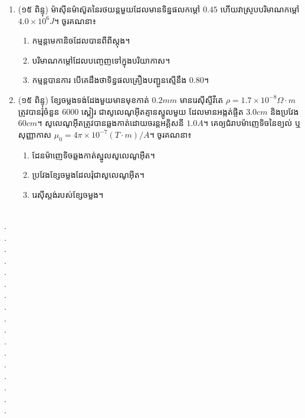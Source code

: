 \documentclass{officialexam}
\begin{document}
\begin{enumerate}[m]
\begin{multicols}{2}
	\end{multicols}
	\item (១៥ ពិន្ទុ) ម៉ាសុីនម៉ាស៊ូតនៃរថយន្តមួយដែលមានទិន្នផលកម្តៅ $0.45$ ហើយវាស្រូបបរិមាណកម្តៅ $4.0\times 10^{6}J$។ ចូរគណនា៖
	\begin{enumerate}[k]
		\item កម្មន្តមេកានិចដែលបានពីពីស្តុង។
		\item បរិមាណកម្តៅដែលបញ្ចេញទៅក្នុងបរិយាកាស។
		\item កម្មន្តបានការ បើគេដឹងថាទិន្នផលគ្រឿងបញ្ជួនស្មើនឹង $0.80$។
	\end{enumerate}
	\item (១៥ ពិន្ទុ) ខ្សែចម្លងទង់ដែងមួយមានមុខកាត់ $0.2mm$ មានរេសុីស្ទីវីតេ $\rho=1.7\times10^{-8}\Omega\cdot m$ ត្រូវបានរុំចំនួន $6000$ ស្ពៀរ ជាសូលេណូអុីតគ្មានស្នូលមួយ ដែលមានអង្កត់ផ្ចិត $3.0cm$ និងប្រវែង $60cm$។ សូលេណូអុីតត្រូវបានឆ្លងកាត់ដោយចរន្តអគ្គិសនី $1.0A$។ គេឲ្យជំរាបម៉ាញេទិចនៃខ្យល់ ឬសុញ្ញាកាស $\mu_0=4\pi\times10^{-7}\left(T\cdot m\right)/A$។ ចូរគណនា៖
	\begin{enumerate}[k,2]
		\item ដែនម៉ាញេទិចឆ្លងកាត់ស្នូលសូលេណូអុីត។
		\item ប្រវែងខ្សែចម្លងដែលរុំជាសូលេណូអុីត។
		\item រេសុីស្តង់របស់ខ្សែចម្លង។
	\end{enumerate}
\end{enumerate}\newpage
{}\\
{\color{white}.}\dotfill\\
{\color{white}.}\dotfill\\
{\color{white}.}\dotfill
\\
{\color{white}.}\dotfill\\
{\color{white}.}\dotfill\\
{\color{white}.}\dotfill
\\
{\color{white}.}\dotfill\\
{\color{white}.}\dotfill\\
{\color{white}.}\dotfill
\\
{\color{white}.}\dotfill\\
{\color{white}.}\dotfill\\
{\color{white}.}\dotfill
\\
{\color{white}.}\dotfill\\
{\color{white}.}\dotfill\\
{\color{white}.}\dotfill
\\
{\color{white}.}\dotfill\\
{\color{white}.}\dotfill\\
\end{document}
